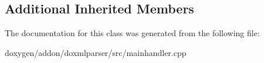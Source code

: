 \subsection*{Additional Inherited Members}


The documentation for this class was generated from the following file\+:\begin{DoxyCompactItemize}
\item 
doxygen/addon/doxmlparser/src/mainhandler.\+cpp\end{DoxyCompactItemize}
